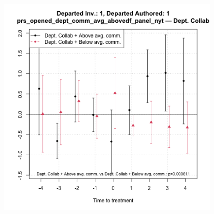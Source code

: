 \begin{figure}[htbp]
\begin{minipage}[b]{0.32\textwidth}
    \label{fig:prs_opened_comm_collab_per_int}
    \end{minipage}
    \hfill
        \begin{minipage}[b]{0.32\textwidth}
        \centering
        \includegraphics[width=\textwidth]{temp/output/collab_imp/auth1_inv1_cs_norm_prs_opened_dept_comm_avg_above_Dept.Collab.png}
    \label{fig:prs_opened_comm_collab_comm_int}
    \end{minipage}



\end{figure}
